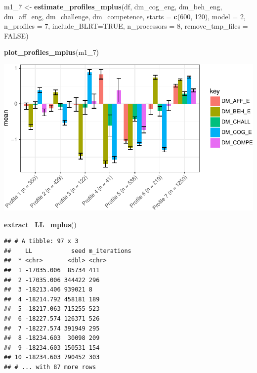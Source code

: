 \documentclass[]{msu-thesis}
\newenvironment{Shaded}{\begin{snugshade}}{\end{snugshade}}
\newcommand{\KeywordTok}[1]{\textcolor[rgb]{0.13,0.29,0.53}{\textbf{#1}}}
\newcommand{\DataTypeTok}[1]{\textcolor[rgb]{0.13,0.29,0.53}{#1}}
\newcommand{\DecValTok}[1]{\textcolor[rgb]{0.00,0.00,0.81}{#1}}
\newcommand{\StringTok}[1]{\textcolor[rgb]{0.31,0.60,0.02}{#1}}
\newcommand{\OtherTok}[1]{\textcolor[rgb]{0.56,0.35,0.01}{#1}}
\newcommand{\NormalTok}[1]{#1}
\theoremstyle{definition}
\theoremstyle{definition}
\theoremstyle{definition}
\theoremstyle{remark}
\begin{document}
\begin{Shaded}
\begin{Highlighting}[]
\NormalTok{m1_}\DecValTok{7}\NormalTok{ <-}\StringTok{ }\KeywordTok{estimate_profiles_mplus}\NormalTok{(df,  }
\NormalTok{                             dm_cog_eng, dm_beh_eng, dm_aff_eng, dm_challenge, dm_competence,}
                             \DataTypeTok{starts =} \KeywordTok{c}\NormalTok{(}\DecValTok{600}\NormalTok{, }\DecValTok{120}\NormalTok{),}
                             \DataTypeTok{model =} \DecValTok{2}\NormalTok{,}
                             \DataTypeTok{n_profiles =} \DecValTok{7}\NormalTok{,}
                             \DataTypeTok{include_BLRT=}\OtherTok{TRUE}\NormalTok{,}
                             \DataTypeTok{n_processors =} \DecValTok{8}\NormalTok{, }\DataTypeTok{remove_tmp_files =} \OtherTok{FALSE}\NormalTok{)}

\KeywordTok{plot_profiles_mplus}\NormalTok{(m1_}\DecValTok{7}\NormalTok{)}
\end{Highlighting}
\end{Shaded}

\includegraphics{rosenberg-dissertation_files/figure-latex/spec-solutions-model2-7-1.pdf}

\begin{Shaded}
\begin{Highlighting}[]
\KeywordTok{extract_LL_mplus}\NormalTok{()}
\end{Highlighting}
\end{Shaded}

\begin{verbatim}
## # A tibble: 97 x 3
##    LL           seed m_iterations
##  * <chr>       <dbl> <chr>       
##  1 -17035.006  85734 411         
##  2 -17035.006 344422 296         
##  3 -18213.406 939021 8           
##  4 -18214.792 458181 189         
##  5 -18217.063 715255 523         
##  6 -18227.574 126371 526         
##  7 -18227.574 391949 295         
##  8 -18234.603  30098 209         
##  9 -18234.603 150531 154         
## 10 -18234.603 790452 303         
## # ... with 87 more rows
\end{verbatim}
\end{document}
